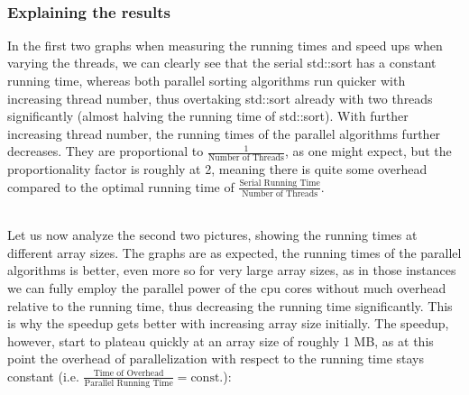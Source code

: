 \documentclass[../../main.tex]{subfiles}
\begin{document}
~\\
\subsubsection{Explaining the results}
In the first two graphs when measuring the running times and speed ups when varying the threads, we can clearly see that the serial std::sort has a constant running time, whereas both parallel sorting algorithms run quicker with increasing thread number, thus overtaking std::sort already with two threads significantly (almost halving the running time of std::sort).
With further increasing thread number, the running times of the parallel algorithms further decreases.
They are proportional to $\frac{1}{\text{Number of Threads}}$, as one might expect, but the proportionality factor is roughly at 2, meaning there is quite some overhead compared to the optimal running time of $\frac{\text{Serial Running Time}}{\text{Number of Threads}}$.

\bigskip

~\\
Let us now analyze the second two pictures, showing the running times at different array sizes.
The graphs are as expected, the running times of the parallel algorithms is better, even more so for very large array sizes, as in those instances we can fully employ the parallel power of the cpu cores without much overhead relative to the running time, thus decreasing the running time significantly.
This is why the speedup gets better with increasing array size initially.
The speedup, however, start to plateau quickly at an array size of roughly 1 MB, as at this point the overhead of parallelization with respect to the running time stays constant (i.e. $\frac{\text{Time of Overhead}}{\text{Parallel Running Time}} = \text{const.}$):
\end{document}
